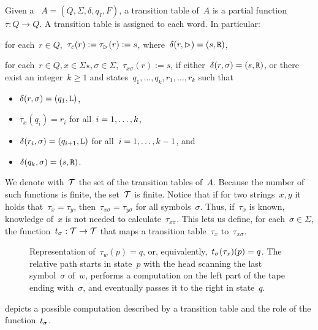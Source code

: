 \begin{defn}\label{def:transtab2DFA}
	Given a \TDFA~$A=(Q,\Sigma,\delta,q_I,F)$, a transition table of~$A$ is a partial function~$\tau:Q\to Q$.
	A transition table is assigned to each word. In particular:
	\begin{rules}
		\item for each~$r\in Q$,~$\tau_\varepsilon(r):=\tau_\rhd(r):=s$, where~$\delta(r,\rhd)=(s,\mathtt R)$,
		\item for each~$r\in Q,x\in\Sigma\star,\sigma\in\Sigma$,~$\tau_{x\sigma}(r):=s$, if either~$\delta(r,\sigma)=(s,\mathtt R)$, or there exist an integer~$k\ge1$ and states~$q_1,\dots,q_k,r_1,\dots,r_k$ such that
		\begin{itemize}
			\item $\delta(r,\sigma)=(q_1,\mathtt L)$,
			\item $\tau_x(q_i)=r_i$ for all~$i=1,\dots,k$,
			\item $\delta(r_i,\sigma)=(q_{i+1},\mathtt L)$ for all~$i=1,\dots,k-1$, and
			\item $\delta(q_k,\sigma)=(s,\mathtt R)$.
		\end{itemize}
	\end{rules}
	We denote with~$\mathcal T$ the set of the transition tables of~$A$.
	Because the number of such functions is finite, the set~$\mathcal T$ is finite.
	Notice that if for two strings~$x,y$ it holds that~$\tau_x=\tau_y$, then~$\tau_{x\sigma}=\tau_{y\sigma}$ for all symbols~$\sigma$.
	Thus, if~$\tau_x$ is known, knowledge of~$x$ is not needed to calculate~$\tau_{x\sigma}$.
	This lets us define, for each~$\sigma\in\Sigma$, the function~$t_\sigma:\mathcal T\to\mathcal T$ that maps a transition table~$\tau_x$ to~$\tau_{x\sigma}$.
\end{defn}

\begin{figure}
	\centering
	
	\caption[A transition table and the function~$\trapp$.]{Representation of~$\tau_w(p)=q$, or, equivalently,~$t_\sigma(\tau_x)(p)=q$.
		The relative path starts in state~$p$ with the head scanning the last symbol~$\sigma$ of~$w$, performs a computation on the left part of the tape ending with~$\sigma$, and eventually passes it to the right in state~$q$.}
	\label{fig:transtab}
\end{figure}

 depicts a possible computation described by a transition table and the role of the function~$t_\sigma$.


